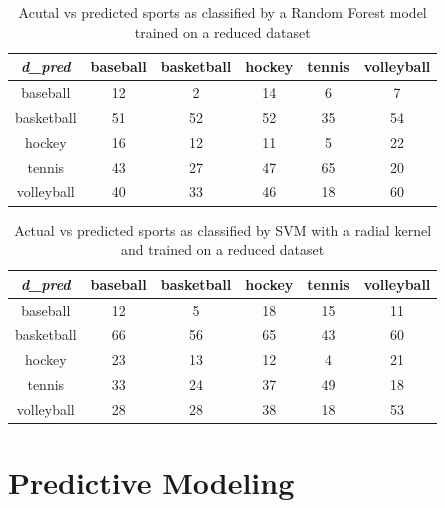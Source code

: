 \documentclass[journal, a4paper]{IEEEtran}
\begin{document}
\begin{table}[ht]
	\begin{center}
		\begin{tabular}{|c|c c c c c|}
			\hline
			\textit{d\_pred}& baseball & basketball & hockey & tennis& volleyball\\
			\hline
			baseball &12&2&14&6&7\\
			basketball &51&52&52&35&54\\
			hockey &16&12&11&5&22\\
			tennis &43&27&47&65&20\\
			volleyball&40&33&46&18&60\\
			\hline
		\end{tabular}
	\end{center}
	\caption{Acutal vs predicted sports as classified by a Random Forest model trained on a reduced dataset}\label{Tab:4}
\end{table}
\begin{table}[ht]
	\begin{center}
		\begin{tabular}{|c|c c c c c|}
			\hline
			\textit{d\_pred}& baseball & basketball & hockey & tennis& volleyball\\
			\hline
			baseball &12&5&18&15&11\\
			basketball &66&56&65&43&60\\
			hockey &23&13&12&4&21\\
			tennis &33&24&37&49&18\\
			volleyball&28&28&38&18&53\\
			\hline
		\end{tabular}
	\end{center}
	\caption{Actual vs predicted sports as classified by SVM with a radial kernel and trained on a reduced dataset}\label{Tab:5}
\end{table}
\section{Predictive Modeling}
\end{document}

